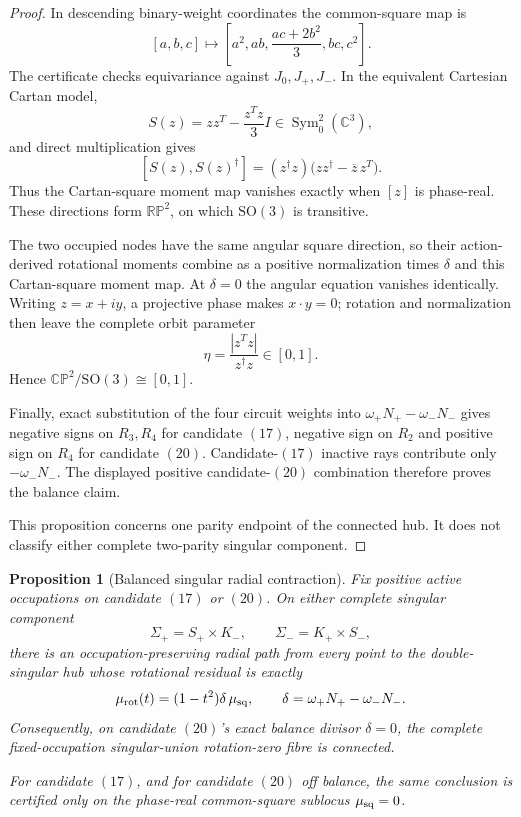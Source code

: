 \documentclass[11pt]{article}
\newtheorem{proposition}[theorem]{Proposition}
\theoremstyle{definition}
\theoremstyle{remark}
\begin{document}
\begin{proof}
In descending binary-weight coordinates the common-square map is
\[
 [a,b,c]\longmapsto
 \left[a^2,ab,\frac{ac+2b^2}{3},bc,c^2\right].
\]
The certificate checks equivariance against \(J_0,J_+,J_-\).  In the
equivalent Cartesian Cartan model,
\[
 S(z)=zz^T-\frac{z^Tz}{3}I\in\operatorname{Sym}^2_0(\mathbb C^3),
\]
and direct multiplication gives
\[
 [S(z),S(z)^\dagger]
 =(z^\dagger z)\bigl(zz^\dagger-\overline z\,z^T\bigr).
\]
Thus the Cartan-square moment map vanishes exactly when \([z]\) is
phase-real.  These directions form \(\mathbb{RP}^2\), on which
\(\mathrm{SO}(3)\) is transitive.

The two occupied nodes have the same angular square direction, so their
action-derived rotational moments combine as a positive normalization times
\(\delta\) and this Cartan-square moment map.  At \(\delta=0\) the angular
equation vanishes identically.  Writing \(z=x+iy\), a projective phase makes
\(x\cdot y=0\); rotation and normalization then leave the complete orbit
parameter
\[
 \eta=\frac{|z^Tz|}{z^\dagger z}\in[0,1].
\]
Hence \(\mathbb{CP}^2/\mathrm{SO}(3)\cong[0,1]\).

Finally, exact substitution of the four circuit weights into
\(\omega_+N_+-\omega_-N_-\) gives negative signs on \(R_3,R_4\) for
candidate \((17)\), negative sign on \(R_2\) and positive sign on \(R_4\)
for candidate \((20)\).  Candidate-\((17)\) inactive rays contribute only
\(-\omega_-N_-\).  The displayed positive candidate-\((20)\) combination
therefore proves the balance claim.

This proposition concerns one parity endpoint of the connected hub.  It does
not classify either complete two-parity singular component.
\end{proof}

\begin{proposition}[Balanced singular radial contraction]
\label{prop:candidate-17-20-singular-radial-contraction}
Fix positive active occupations on candidate \((17)\) or \((20)\).  On either
complete singular component
\[
 \Sigma_+=S_+\times K_-,
 \qquad
 \Sigma_-=K_+\times S_-,
\]
there is an occupation-preserving radial path from every point to the
double-singular hub whose rotational residual is exactly
\[
 \mu_{\rm rot}(t)
   =(1-t^2)\delta\,\mu_{\rm sq},
 \qquad
 \delta=\omega_+N_+-\omega_-N_-.
\]
Consequently, on candidate \((20)\)'s exact balance divisor
\(\delta=0\), the complete fixed-occupation singular-union
rotation-zero fibre is connected.

For candidate \((17)\), and for candidate \((20)\) off balance, the same
conclusion is certified only on the phase-real common-square sublocus
\(\mu_{\rm sq}=0\).
\end{proposition}
\end{document}
